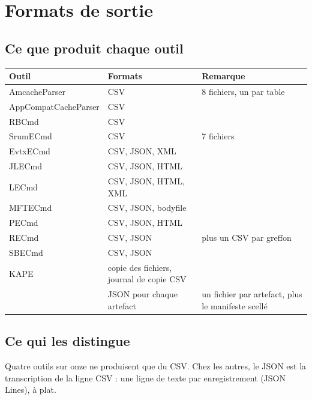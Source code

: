 \documentclass[11pt,a4paper,oneside]{report}
\begin{document}
\chapter{Formats de sortie}

\section{Ce que produit chaque outil}

\begin{longtable}{@{}L{4.4cm}L{5.4cm}L{5.2cm}@{}}
\toprule
\textbf{Outil} & \textbf{Formats} & \textbf{Remarque} \\
\midrule\endhead
AmcacheParser & CSV & 8 fichiers, un par table \\
AppCompatCacheParser & CSV & \\
RBCmd & CSV & \\
SrumECmd & CSV & 7 fichiers \\
EvtxECmd & CSV, JSON, XML & \\
JLECmd & CSV, JSON, HTML & \\
LECmd & CSV, JSON, HTML, XML & \\
MFTECmd & CSV, JSON, bodyfile & \\
PECmd & CSV, JSON, HTML & \\
RECmd & CSV, JSON & plus un CSV par greffon \\
SBECmd & CSV, JSON & \\
KAPE & copie des fichiers, journal de copie CSV & \\
\wac{} & JSON pour chaque artefact & un fichier par artefact, plus le manifeste scellé \\
\bottomrule
\end{longtable}

\section{Ce qui les distingue}

Quatre outils sur onze ne produisent que du CSV. Chez les autres, le JSON est la
transcription de la ligne CSV : une ligne de texte par enregistrement (JSON
Lines), à plat.
\end{document}
